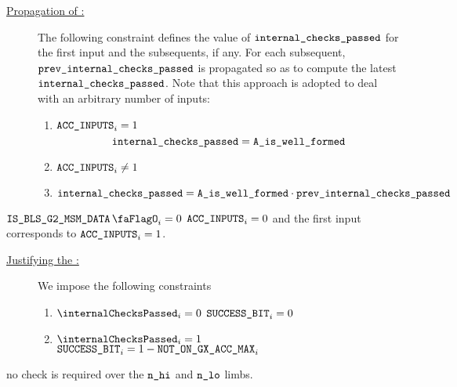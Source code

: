 \begin{description}
    \item[\underline{Propagation of \locInternalChecksPassed:}]
          The following constraint defines the value of $\texttt{internal\_checks\_passed}$ for the first input and the subsequents, if any.
          For each subsequent, $\texttt{prev\_}\texttt{internal\_checks\_passed}$ is propagated so as to compute the latest $\texttt{internal\_checks\_passed}$.
          Note that this approach is adopted to deal with an arbitrary number of inputs:
          \begin{enumerate}
              \item \If $\texttt{ACC\_INPUTS}_{i} = 1$ \Then
                    \[
                        \texttt{internal\_checks\_passed} = \texttt{A\_is\_well\_formed} 
                    \]
              \item \If $\texttt{ACC\_INPUTS}_{i} \neq 1$ \Then
                    \item $\texttt{internal\_checks\_passed} = \texttt{A\_is\_well\_formed} \cdot \texttt{prev\_}\texttt{internal\_checks\_passed}$
          \end{enumerate}
\end{description}
\saNote{} \If $\isBlsGTwoMsmData_{i} = 0$ \Then $\texttt{ACC\_INPUTS}_{i} = 0$ and the first input corresponds to $\texttt{ACC\_INPUTS}_{i} = 1$.
\begin{description}
    \item[\underline{Justifying the \blsSuccessBit{}:}]
          We impose the following constraints
          \begin{enumerate}
              \item \If $\internalChecksPassed _{i}= 0$ \Then $\texttt{SUCCESS\_BIT} _{i} = 0$
              \item \If $\internalChecksPassed _{i}= 1$  \Then $\texttt{SUCCESS\_BIT}_{i} = 1 - \texttt{NOT\_ON\_GX\_ACC\_MAX} _{i}$
          \end{enumerate}
\end{description}

\saNote{} no check is required over the $\texttt{n}\texttt{\_hi}$ and $\texttt{n}\texttt{\_lo}$ limbs.
